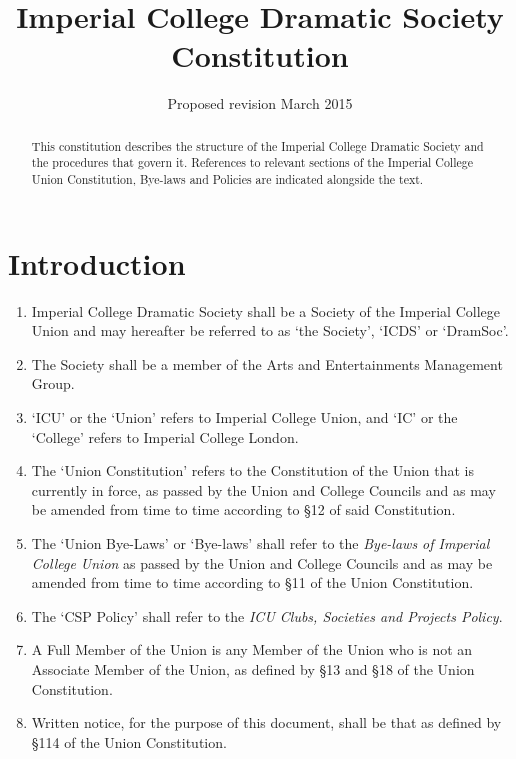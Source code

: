 \documentclass[a4paper]{tufte-handout}
\title{Imperial College Dramatic Society Constitution}
\date{Proposed revision March 2015}
\newcommand{\policyOffset}{12pt}
\newcommand{\policyCspp}[2][\policyOffset]{\marginnote[#1]{\textsc{CSP Policy \S#2}}}
\begin{document}
\maketitle

\begin{fullwidth}
\itshape

\begin{abstract}
This constitution describes the structure of the Imperial College Dramatic Society and the procedures that govern it.
References to relevant sections of the Imperial College Union Constitution, Bye-laws and Policies are indicated alongside the text.
\end{abstract}
\end{fullwidth}

\hdashrule{15cm}{1.1pt}{1.1pt}

\section{Introduction}
\begin{enumerate}
    \item Imperial College Dramatic Society shall be a Society of the Imperial College Union and may hereafter be referred to as `the Society', `ICDS' or `DramSoc'.
    \item \policyCspp{33} The Society shall be a member of the Arts and Entertainments Management Group.
    \item `ICU' or the `Union' refers to Imperial College Union, and `IC' or the `College' refers to Imperial College London.
    \item The `Union Constitution' refers to the Constitution of the Union that is currently in force, as passed by the Union and College Councils and as may be amended from time to time according to \S12 of said Constitution.
    \item The `Union Bye-Laws' or `Bye-laws' shall refer to the \textit{Bye-laws of Imperial College Union} as passed by the Union and College Councils and as may be amended from time to time according to \S11 of the Union Constitution.
    \item The `CSP Policy' shall refer to the \textit{ICU Clubs, Societies and Projects Policy}.
    \item A Full Member of the Union is any Member of the Union who is not an Associate Member of the Union, as defined by \S13 and \S18 of the Union Constitution.
    \item Written notice, for the purpose of this document, shall be that as defined by \S114 of the Union Constitution.
\end{enumerate}
\end{document}
